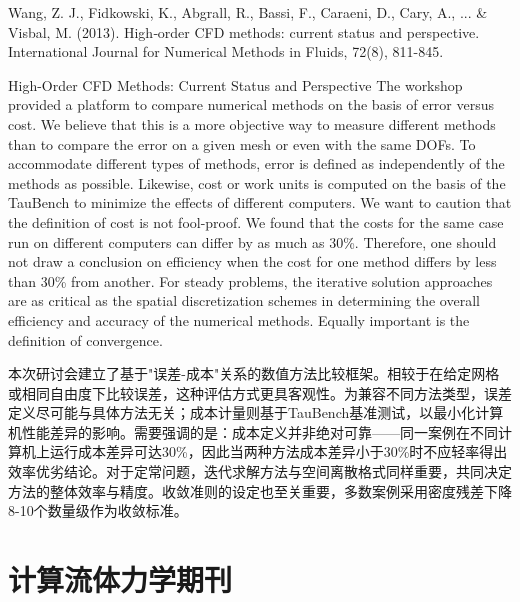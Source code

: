 \documentclass{book}
\begin{document}




Wang, Z. J., Fidkowski, K., Abgrall, R., Bassi, F., Caraeni, D., Cary, A., ... \& Visbal, M. (2013). High‐order CFD methods: current status and perspective. International Journal for Numerical Methods in Fluids, 72(8), 811-845.

High-Order CFD Methods: Current Status and Perspective
The workshop provided a platform to compare numerical methods on the basis of error versus cost. We believe that this is a more objective way to measure different methods than to compare the error on a given mesh or even with the same DOFs. To accommodate different types of methods, error is defined as independently of the methods as possible. Likewise, cost or work units is computed on the basis of the TauBench to minimize the effects of different computers. We want to caution that the definition of cost is not fool-proof. We found that the costs for the same case run on different computers can differ by as much as 30\%. Therefore, one should not draw a conclusion on efficiency when the cost for one method differs by less than 30\% from another. For steady problems, the iterative solution approaches are as critical as the spatial discretization schemes in determining the overall efficiency and accuracy of the numerical methods. Equally important is the definition of convergence.



本次研讨会建立了基于"误差-成本"关系的数值方法比较框架。相较于在给定网格或相同自由度下比较误差，这种评估方式更具客观性。为兼容不同方法类型，误差定义尽可能与具体方法无关；成本计量则基于TauBench基准测试，以最小化计算机性能差异的影响。需要强调的是：成本定义并非绝对可靠——同一案例在不同计算机上运行成本差异可达30\%，因此当两种方法成本差异小于30\%时不应轻率得出效率优劣结论。对于定常问题，迭代求解方法与空间离散格式同样重要，共同决定方法的整体效率与精度。收敛准则的设定也至关重要，多数案例采用密度残差下降8-10个数量级作为收敛标准。
\section{计算流体力学期刊}
\end{document}
